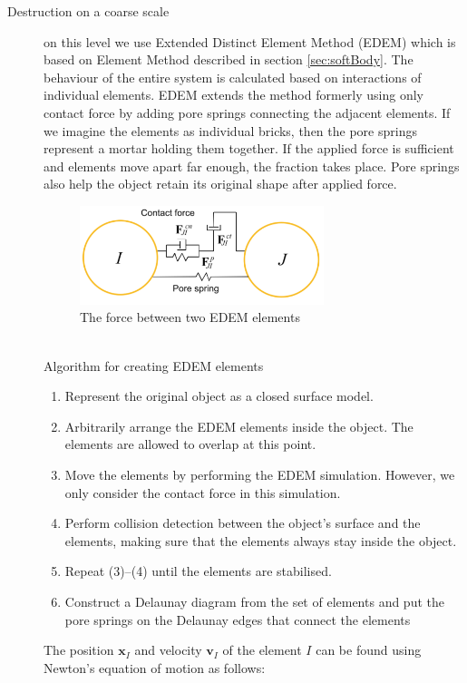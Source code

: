 \begin{description}
\item[Destruction on a coarse scale] on this level we use Extended Distinct Element Method (EDEM) which is based on Element Method described in section \ref{sec:softBody}. The behaviour of the entire system is calculated based on interactions of individual elements. EDEM extends the method formerly using only contact force by adding pore springs connecting the adjacent elements. If we imagine the elements as individual bricks, then the pore springs represent a mortar holding them together. If the applied force is sufficient and elements move apart far enough, the fraction takes place. Pore springs also help the object retain its original shape after applied force.
\begin{figure}[ht!]
        \centering
        \includegraphics[width=0.7\textwidth]{img/spring}
        \caption{The force between two EDEM elements \cite{edem}}
        \label{spring}
\end{figure}
\\Algorithm for creating EDEM elements
\begin{enumerate}
\item Represent the original object as a closed surface model.
\item Arbitrarily arrange the EDEM elements inside the object.
The elements are allowed to overlap at this point.
\item Move the elements by performing the EDEM simulation. However, we only consider the contact force in this simulation.
\item Perform collision detection between the object’s surface
and the elements, making sure that the elements always
stay inside the object.
\item Repeat (3)–(4) until the elements are stabilised.
\item Construct a Delaunay diagram from the set of elements
and put the pore springs on the Delaunay edges that connect
the elements
\end{enumerate}
The position $\mathbf{x}_I$ and velocity $\mathbf{v}_I$ of the element $\mathit{I}$ can be found using Newton’s equation of motion as follows:
 

\end{description}
